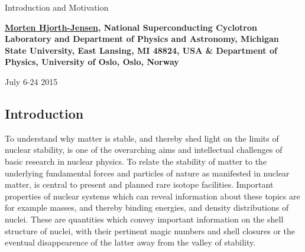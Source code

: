 \documentclass[%
twoside,                 %
final,                   %
10pt]{article}
\begin{document}






\thispagestyle{empty}

\begin{center}
{\LARGE\bf
\begin{spacing}{1.25}
Introduction and Motivation
\end{spacing}
}
\end{center}


\begin{center}
{\bf \href{{http://computationalphysics.no}}{Morten Hjorth-Jensen}, National Superconducting Cyclotron Laboratory and Department of Physics and Astronomy, Michigan State University, East Lansing, MI 48824, USA {\&} Department of Physics, University of Oslo, Oslo, Norway${}^{}$} \\ [0mm]
\end{center}

    \begin{center}
\end{center}
    

\begin{center} %
July 6-24 2015
\end{center}

\vspace{1cm}


\tableofcontents


\vspace{1cm} %




\subsection*{Introduction}

To understand why matter is stable, and thereby shed light on the limits of 
nuclear stability, is one of the 
overarching aims and intellectual challenges 
of basic research in nuclear physics. To relate the stability of matter
to the underlying fundamental forces and particles of nature as manifested in nuclear matter, is central
to present and planned rare isotope facilities. 
Important properties of nuclear systems which can reveal information about these topics 
are for example masses, and thereby binding energies, and density distributions of nuclei.  
These are quantities which convey important information on 
the shell structure of nuclei, with their 
pertinent magic numbers and shell closures or the  eventual disappearence of the latter 
away from  the valley of stability.
\end{document}

